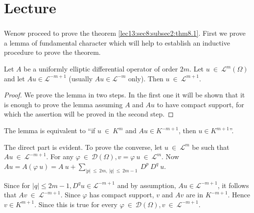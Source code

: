 
\chapter{Lecture}\label{lec14}%

\setcounter{section}{8}

\subsection{}\label{lec14:sec8:subsec3}
 
We\pageoriginale now proceed to prove the theorem \ref{lec13:sec8:subsec2:thm8.1}. First we prove a lemma of
fundamental character which will help to establish an inductive
procedure to prove the theorem. 

\begin{lemma}\label{lec14:sec8:subsec3:lem8.1}%
  Let $A$ be a uniformly elliptic differential operator of order
  $2m$. Let $u ~ \in ~ \mathscr{L}^m(\Omega)$ and let $Au
  \in \mathscr{L}^{-m+1}$ (usually $Au \in \mathscr{L}^{-m}$
  only). Then $u ~ \in ~\mathscr{L}^{m+1}$. 
\end{lemma} 
 
 \begin{proof}
   We prove the lemma in two steps. In the first one it will be shown
   that it is enough to prove the lemma assuming $A$ and $Au$ to have
   compact support, for which the assertion will be proved in the second
   step. 
 \end{proof} 

\begin{step}\label{lec14:sec8:subsec3:step1}%
  The lemma is equivalent to ``if $u ~ \in ~ K^m$ and $Au
  \in K^{-m+1}$, then $u \in K^{m+1}$''. 
 \end{step} 
 
The direct part is evident. To prove the converse, let $u ~
\in ~ \mathscr{L}^m$ be such that $Au~  \in ~
\mathscr{L}^{-m+1}$. For any $\varphi ~ \in ~
\mathscr{D}(\Omega), v = \varphi ~ u ~ \in ~
\mathscr{L}^m$. Now $Au = A(\varphi~ u) = A ~ u + \sum\limits_{|p|~\le
  ~ 2m, ~ |q| ~ \le ~ 2m-1} ~ D^p ~ D^q ~ u$. 

\medskip
\noindent
Since for $|q| \le 2m-1, D^q u \in \mathscr{L}^{-m+1}$ and by
assumption, $A u \in \mathscr{L}^{-m+1}$, it follows that $Av
~\in~ \mathscr{L}^{-m+1}$. Since $\varphi$ has compact
support, $v$ and $Av$ are in $K^{-m+1}$. Hence $v \in
K^{m+1}$. Since this is true for every $\varphi ~ \in ~
\mathscr{D}(\Omega), v ~ \in ~ \mathscr{L}^{-m+1}$. 

